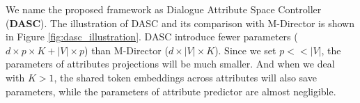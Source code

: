 We name the proposed framework as Dialogue Attribute Space Controller (\textbf{DASC}). The illustration of DASC and its comparison with M-Director is shown in Figure \ref{fig:dasc_illustration}. DASC introduce fewer parameters ($d\times p \times K + |V| \times p$)  than M-Director ($d \times |V| \times K$). Since we set $p << |V|$, the parameters of attributes projections will be much smaller. And when we deal with $K > 1$, the shared token embeddings across attributes will also save parameters, while the parameters of attribute predictor are almost negligible. %

